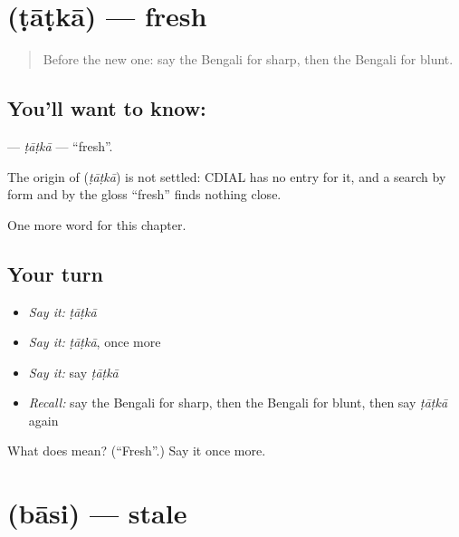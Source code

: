 \section[\texorpdfstring{\bn{টাটকা} (ṭāṭkā)}{টাটকা (ṭāṭkā)}]{ (ṭāṭkā) — fresh}

\label{lesson:BN-C140-tatka}



\begin{quote}
Before the new one: say the Bengali for sharp, then the Bengali for blunt.
\end{quote}

\subsection*{You'll want to know: }
\textbf{} — \emph{ṭāṭkā} — \textquotedblleft{}fresh\textquotedblright{}.

\begin{cousinweb}
The origin of \textbf{} (\emph{ṭāṭkā}) is not settled: CDIAL has no entry for it, and a search by form and by the gloss \textquotedblleft{}fresh\textquotedblright{} finds nothing close.
\end{cousinweb}

\begin{grammarlens}[title={What you've built}]
One more word for this chapter.
\end{grammarlens}

\subsection*{Your turn}
\begin{itemize}
\raggedright
  \item \emph{Say it:} \emph{ṭāṭkā}
  \item \emph{Say it:} \emph{ṭāṭkā}, once more
  \item \emph{Say it:} say \emph{ṭāṭkā}
  \item \emph{Recall:} say the Bengali for sharp, then the Bengali for blunt, then say \emph{ṭāṭkā} again
\end{itemize}

\begin{tcolorbox}[breakable,colback=teal!4,colframe=teal!35!black,title={Before you move on}]
What does  mean? (\textquotedblleft{}Fresh\textquotedblright{}.) Say it once more.
\end{tcolorbox}
\section[\texorpdfstring{\bn{বাসি} (bāsi)}{বাসি (bāsi)}]{ (bāsi) — stale}

